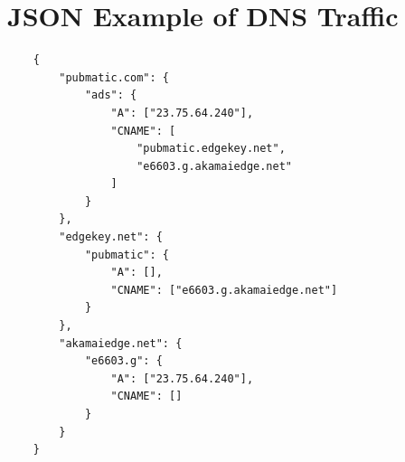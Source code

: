 
%






\chapter{JSON Example of DNS Traffic}
\label{json-appendix}

\setcounter{listing}{0}
\begin{listing}[!ht]
    \begin{verbatim}
    {
        "pubmatic.com": {
            "ads": {
                "A": ["23.75.64.240"],
                "CNAME": [
                    "pubmatic.edgekey.net",
                    "e6603.g.akamaiedge.net"
                ]
            }
        },
        "edgekey.net": {
            "pubmatic": {
                "A": [],
                "CNAME": ["e6603.g.akamaiedge.net"]
            }
        },
        "akamaiedge.net": {
            "e6603.g": {
                "A": ["23.75.64.240"],
                "CNAME": []
            }
        }
    }
    \end{verbatim}
    \caption{Example of a logged DNS response for \texttt{ads.pubmatic.com} with both \textit{A} and \textit{CNAME} records. For each logged \textit{CNAME} for \texttt{ads.pubmatic.com}, another separate record is made, containing only the record for the following \textit{CNAME} in the original list. The record for the last \textit{CNAME} in the original list has the same \textit{A} response as the original request for \texttt{ads.pubmatic.com}.}
    \label{stored-dns-figure}
\end{listing}

%
